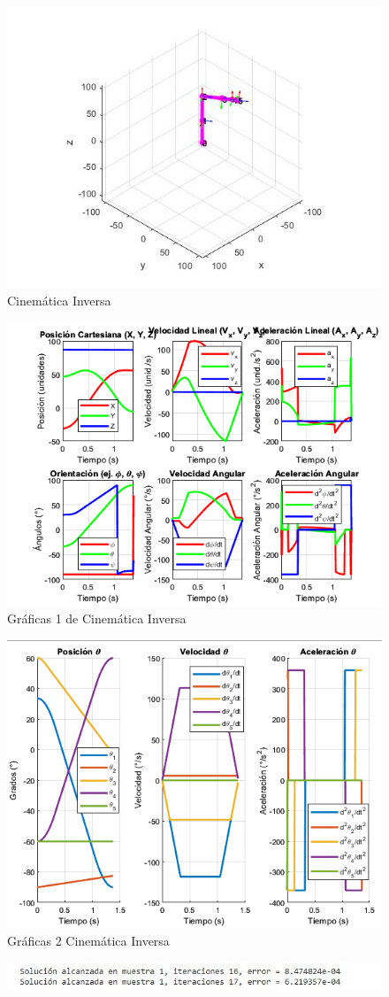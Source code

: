\begin{figure}
	\centering
	\includegraphics[width=0.5\linewidth]{img/Cinematicainversa}
	\caption{Cinemática Inversa}
	\label{fig:cinematicainversa}
\end{figure}

\begin{figure}
	\centering
	\includegraphics[width=0.5\linewidth]{img/cinematicainversa_grafica1}
	\caption{Gráficas 1 de Cinemática Inversa }
	\label{fig:cinematicainversagrafica1}
\end{figure}

\begin{figure}
	\centering
	\includegraphics[width=0.5\linewidth]{img/Cinematicainversa_grafica2}
	\caption{Gráficas 2 Cinemática Inversa}
	\label{fig:cinematicainversagrafica2}
\end{figure}

\begin{figure}
	\centering
	\includegraphics[width=0.5\linewidth]{img/cinematicainversa_error}
	\caption{}
	\label{fig:cinematicainversaerror}
\end{figure}


